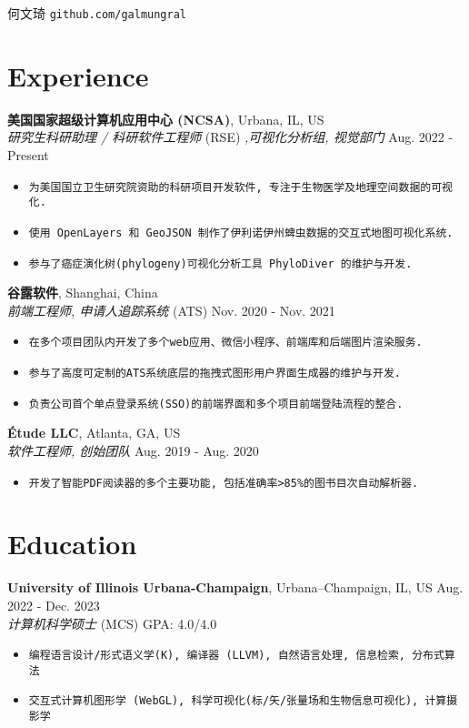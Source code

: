 \documentclass[12pt]{article}
\begin{document}
{\Huge\textsf{何文琦}} \quad \texttt{github.com/galmungral}

\section*{Experience}

\textbf{美国国家超级计算机应用中心 (NCSA)}, Urbana, IL, US\\
\textit{研究生科研助理 / 科研软件工程师} (RSE) \textit{,可视化分析组, 视觉部门} \hfill Aug. 2022 - Present
\begin{itemize}
\item \texttt{为美国国立卫生研究院资助的科研项目开发软件, 专注于生物医学及地理空间数据的可视化.}
\item \texttt{使用 OpenLayers 和 GeoJSON 制作了伊利诺伊州蜱虫数据的交互式地图可视化系统.}
\item \texttt{参与了癌症演化树(phylogeny)可视化分析工具 PhyloDiver 的维护与开发.}
\end{itemize}

\textbf{谷露软件}, Shanghai, China\\
\textit{前端工程师, 申请人追踪系统} (ATS) \hfill Nov. 2020 - Nov. 2021
\begin{itemize}
\item \texttt{在多个项目团队内开发了多个web应用、微信小程序、前端库和后端图片渲染服务.}
\item \texttt{参与了高度可定制的ATS系统底层的拖拽式图形用户界面生成器的维护与开发.}
\item \texttt{负责公司首个单点登录系统(SSO)的前端界面和多个项目前端登陆流程的整合.}
\end{itemize}

\textbf{Étude LLC}, Atlanta, GA, US\\
\textit{软件工程师, 创始团队} \hfill Aug. 2019 - Aug. 2020
\begin{itemize}
\item \texttt{开发了智能PDF阅读器的多个主要功能, 包括准确率>85\%的图书目次自动解析器.}
\end{itemize}

\section*{Education}
\textbf{University of Illinois Urbana-Champaign}, Urbana–Champaign, IL, US \hfill Aug. 2022 - Dec. 2023 \\
\textit{计算机科学硕士} (MCS)  \hfill GPA: 4.0/4.0 
\begin{itemize}
\item \texttt{编程语言设计/形式语义学(K), 编译器 (LLVM), 自然语言处理, 信息检索, 分布式算法}
\item \texttt{交互式计算机图形学 (WebGL), 科学可视化(标/矢/张量场和生物信息可视化), 计算摄影学}
\end{itemize}
\end{document}
